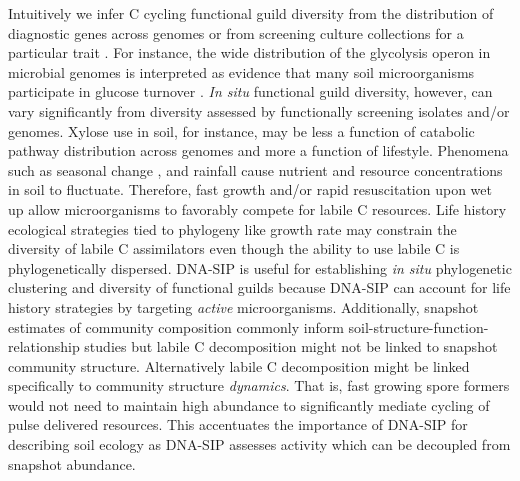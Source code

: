 Intuitively we infer C cycling functional guild diversity from the distribution
of diagnostic genes across genomes \citep{Berlemont2013} or from screening
culture collections for a particular trait \citep{Martiny2013}. For
instance, the wide distribution of the glycolysis operon in microbial
genomes is interpreted as evidence that many soil microorganisms
participate in glucose turnover \citep{McGuire2010}. \textit{In situ}
functional guild diversity, however, can vary significantly from diversity
assessed by functionally screening isolates and/or genomes. Xylose use in soil,
for instance, may be less a function of catabolic pathway distribution across
genomes and more a function of lifestyle. Phenomena such as seasonal change
\citep{Schmidt2007}, and rainfall \citep{Placella2012} cause nutrient and
resource concentrations in soil to fluctuate. Therefore, fast growth and/or
rapid resuscitation upon wet up \citep{Placella2012} allow microorganisms to
favorably compete for labile C resources. Life history ecological strategies
tied to phylogeny like growth rate \citep{Fierer2007} may constrain the
diversity of labile C assimilators even though the ability to use labile C is
phylogenetically dispersed. DNA-SIP is useful for establishing \textit{in situ}
phylogenetic clustering and diversity of functional guilds because DNA-SIP can
account for life history strategies by targeting \textit{active}
microorganisms. Additionally, snapshot estimates of community composition
commonly inform soil-structure-function-relationship studies \citep{Fierer2007}
but labile C decomposition might not be linked to snapshot community structure.
Alternatively labile C decomposition might be linked specifically to community
structure \textit{dynamics}. That is, fast growing spore formers would not need
to maintain high abundance to significantly mediate cycling of pulse delivered
resources. This accentuates the importance of DNA-SIP for describing soil
ecology as DNA-SIP assesses activity which can be decoupled from snapshot
abundance.

